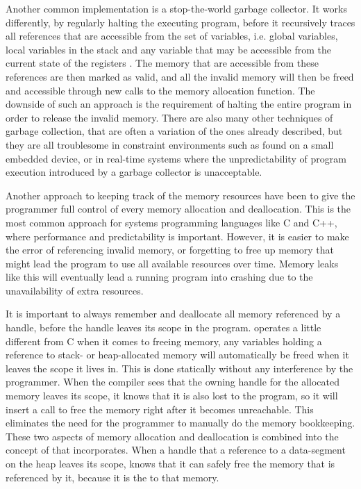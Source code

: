Another common implementation is a stop-the-world garbage collector.
It works differently, by regularly halting the executing program, before it recursively traces all references that are accessible from the  set of variables, i.e. global variables, local variables in the stack and any variable that may be accessible from the current state of the registers \cite{Wilson1992}.
The memory that are accessible from these references are then marked as valid, and all the invalid memory will then be freed and accessible through new calls to the memory allocation function.
The downside of such an approach is the requirement of halting the entire program in order to release the invalid memory.
There are also many other techniques of garbage collection, that are often a variation of the ones already described, but they are all troublesome in constraint environments such as found on a small embedded device, or in real-time systems where the unpredictability of program execution introduced by a garbage collector is unacceptable.

Another approach to keeping track of the memory resources have been to give the programmer full control of every memory allocation and deallocation.
This is the most common approach for systems programming languages like C and C++, where performance and predictability is important.
However, it is easier to make the error of referencing invalid memory, or forgetting to free up memory that might lead the program to use all available resources over time.
Memory leaks like this will eventually lead a running program into crashing due to the unavailability of extra resources.


It is important to always remember and deallocate all memory referenced by a handle, before the handle leaves its scope in the program.
\rust operates a little different from C when it comes to freeing memory, any variables holding a reference to stack- or heap-allocated memory will automatically be freed when it leaves the scope it lives in.
This is done statically without any interference by the programmer.
When the compiler sees that the owning handle for the allocated memory leaves its scope, it knows that it is also lost to the program, so it will insert a call to free the memory right after it becomes unreachable.
This eliminates the need for the programmer to manually do the memory bookkeeping.
These two aspects of memory allocation and deallocation is combined into the concept of  that {\rust} incorporates.
When a handle that  a reference to a data-segment on the heap leaves its scope, {\rust} knows that it can safely free the memory that is referenced by it, because it is the  to that memory.

